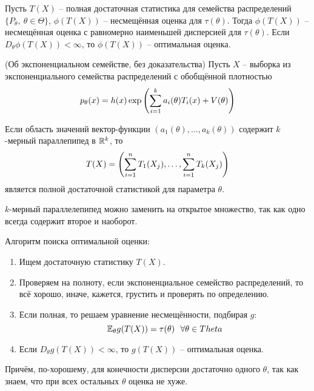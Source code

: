\begin{corollary}
    Пусть $T(X)$ -- полная достаточная статистика для семейства распределений $\{P_\theta,\ \theta \in \Theta\}$, $\phi(T(X))$ -- несмещённая оценка для $\tau(\theta)$. Тогда $\phi(T(X))$ -- несмещённая оценка с равномерно наименьшей дисперсией для $\tau(\theta)$. Если $D_\theta \phi(T(X)) < \infty$, то $\phi(T(X))$ -- оптимальная оценка.
\end{corollary}

\begin{theorem} (Об экспоненциальном семействе, без доказательства)
    Пусть $X$ -- выборка из экспоненциального семейства распределений с обобщённой плотностью
    \[
        p_\theta(x) = h(x) \exp \left(\sum_{i=1}^k a_i(\theta) T_i(x) + V(\theta)\right)
    \]

    Если область значений вектор-функции $(a_1(\theta), \dots, a_k(\theta))$ содержит $k$-мерный параллепипед в $\mathbb{R}^k$, то
    \[
        T(X) = \left(\sum_{i=1}^n T_1(X_j), \dots, \sum_{i=1}^n T_k(X_j)\right)
    \]
    является полной достаточной статистикой для параметра $\theta$.
\end{theorem}

\begin{note}
    $k$-мерный параллелепипед можно заменить на открытое множество, так как одно всегда содержит второе и наоборот.
\end{note}

\begin{note}
    Алгоритм поиска оптимальной оценки:
    \begin{enumerate}
        \item Ищем достаточную статистику $T(X)$.
        \item Проверяем на полноту, если экспоненциальное семейство распределений, то всё хорошо, иначе, кажется, грустить и проверять по определению.
        \item Если полная, то решаем уравнение несмещённости, подбирая $g$:
        \[
            \E_\theta g(T(X)) = \tau(\theta) \ \ \forall \theta \in Theta
        \]
        \item Если $D_\theta g(T(X)) < \infty$, то $g(T(X))$ -- оптимальная оценка.        
    \end{enumerate}
\end{note}

\begin{note}
    Причём, по-хорошему, для конечности дисперсии достаточно одного $\theta$, так как знаем, что при всех остальных $\theta$ оценка не хуже.
\end{note}